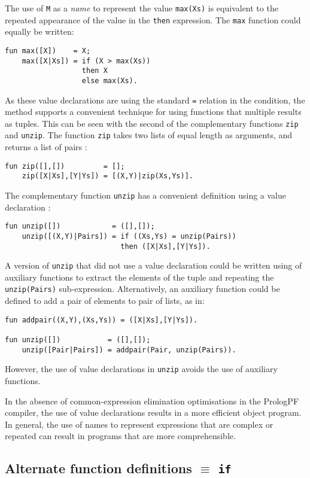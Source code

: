The use of \texttt{M} as a \textit{name} to represent the value
\texttt{max(Xs)} is equivalent to the repeated appearance of
the value in the \texttt{then} expression.  The \texttt{max} function
could equally be written:
\begin{verbatim}
fun max([X])    = X;
    max([X|Xs]) = if (X > max(Xs))
                  then X
                  else max(Xs).
\end{verbatim}
As these value declarations are using the standard \texttt{=}
relation in the condition, the method supports a convenient
technique for using functions that multiple results as
tuples.  This can be seen with the second of the
complementary functions
\texttt{zip} and \texttt{unzip}.  The function \texttt{zip}
takes two lists of equal length as arguments, and returns a
list of pairs \cite{HAK+97}:
\begin{verbatim}
fun zip([],[])         = [];
    zip([X|Xs],[Y|Ys]) = [(X,Y)|zip(Xs,Ys)].
\end{verbatim}
The complementary function \texttt{unzip} has a convenient
definition using a value declaration \cite{Pau91}:
\begin{verbatim}
fun unzip([])            = ([],[]);
    unzip([(X,Y)|Pairs]) = if ((Xs,Ys) = unzip(Pairs))
                           then ([X|Xs],[Y|Ys]).
\end{verbatim}
A version of \texttt{unzip} that did not use a value
declaration could be written using of auxiliary functions to
extract the elements of the tuple and repeating the \texttt{unzip(Pairs)}
sub-expression.  Alternatively, an auxiliary function could be
defined to add a pair of elements to pair of lists, as in:
\begin{verbatim}
fun addpair((X,Y),(Xs,Ys)) = ([X|Xs],[Y|Ys]).

fun unzip([])           = ([],[]);
    unzip([Pair|Pairs]) = addpair(Pair, unzip(Pairs)).
\end{verbatim}
However, the use of value declarations in \texttt{unzip} avoids the
use of auxiliary functions.

In the absence of common-expression elimination optimisations in the
PrologPF compiler, the use of value declarations results in a more efficient
object program.  In general, the use of names to represent expressions
that are complex or repeated can result in programs that are more
comprehensible.

\subsection{Alternate function definitions $\equiv$ \texttt{if}}
\label{alt_if}

